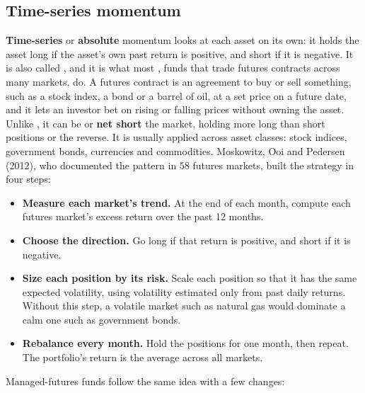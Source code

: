 \subsection{Time-series momentum}

\textbf{Time-series} or \textbf{absolute} momentum looks at each asset on its own: it holds the asset long if the asset's own past return is positive, and short if it is negative. It is also called , and it is what most , funds that trade futures contracts across many markets, do. A futures contract is an agreement to buy or sell something, such as a stock index, a bond or a barrel of oil, at a set price on a future date, and it lets an investor bet on rising or falling prices without owning the asset. Unlike , it can be  or \textbf{net short} the market, holding more long than short positions or the reverse. It is usually applied across asset classes: stock indices, government bonds, currencies and commodities. Moskowitz, Ooi and Pedersen (2012), who documented the pattern in 58 futures markets, built the strategy in four steps:

\begin{itemize}
  \item \textbf{Measure each market's trend.} At the end of each month, compute each futures market's excess return over the past 12 months.
  \item \textbf{Choose the direction.} Go long if that return is positive, and short if it is negative.
  \item \textbf{Size each position by its risk.} Scale each position so that it has the same expected volatility, using volatility estimated only from past daily returns. Without this step, a volatile market such as natural gas would dominate a calm one such as government bonds.
  \item \textbf{Rebalance every month.} Hold the positions for one month, then repeat. The portfolio's return is the average across all markets.
\end{itemize}

Managed-futures funds follow the same idea with a few changes:

